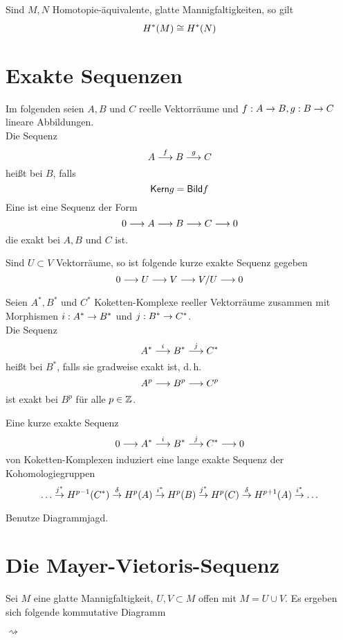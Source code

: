 \Kor{}
Sind $M,N$ Homotopie-äquivalente, glatte Mannigfaltigkeiten, so gilt
\[ H^*(M) \overset{}{\cong} H^*(N)  \]

\section{Exakte Sequenzen}
\Def{}
Im folgenden seien $A,B$ und $C$ reelle Vektorräume und $f : A\overset{}{\rightarrow} B, g : B \overset{}{\rightarrow} C$ lineare Abbildungen.\\
Die Sequenz
\[ A \overset{f}{\longrightarrow} B \overset{g}{\longrightarrow} C \]
heißt  bei $B$, falls
\[ \textsf{Kern} g = \textsf{Bild} f \]
Eine  ist eine Sequenz der Form
\[ 0 \overset{}{\longrightarrow} A \overset{}{\longrightarrow} B \overset{}{\longrightarrow} C \overset{}{\longrightarrow} 0 \]
die exakt bei $A,B$ und $C$ ist.

\Bsp{}
Sind $U \subset V$ Vektorräume, so ist folgende kurze exakte Sequenz gegeben
\[ 0 \overset{}{\longrightarrow} U \overset{}{\longrightarrow} V \overset{}{\longrightarrow} V/U \overset{}{\longrightarrow} 0 \]

\Def{}
Seien $A^*,B^*$ und $C^*$ Koketten-Komplexe reeller Vektorräume zusammen mit Morphismen $i : A^* \overset{}{\rightarrow} B^*$ und $j : B^* \overset{}{\rightarrow} C^*$.\\
Die Sequenz
\[ A^* \overset{i}{\longrightarrow} B^* \overset{j}{\longrightarrow} C^* \]
heißt  bei $B^*$, falls sie gradweise exakt ist, d.\,h.
\[ A^p \overset{}{\longrightarrow} B^p \overset{}{\longrightarrow} C^p \]
ist exakt bei $B^p$ für alle $p\in \mathbb{Z}$.

Eine kurze exakte Sequenz
\[ 0 \overset{}{\longrightarrow} A^* \overset{i}{\longrightarrow} B^* \overset{j}{\longrightarrow} C^* \overset{}{\longrightarrow} 0  \]
von Koketten-Komplexen induziert eine lange exakte Sequenz der Kohomologiegruppen
\[ \ldots \overset{j^*}{\rightarrow} H^{p-1}(C^*) \overset{\delta}{\rightarrow} H^p(A) \overset{i^*}{\rightarrow} H^p(B) \overset{j^*}{\rightarrow} H^p(C) \overset{\delta}{\rightarrow} H^{p+1}(A) \overset{i^*}{\rightarrow} \ldots  \]
\begin{Beweis}{}
	Benutze Diagrammjagd.
\end{Beweis}

\section{Die Mayer-Vietoris-Sequenz}

Sei $M$ eine glatte Mannigfaltigkeit, $U,V \subset M$ offen mit $M = U\cup V$. Es ergeben sich folgende kommutative Diagramm
\begin{center}
$\rightsquigarrow$
\end{center}

